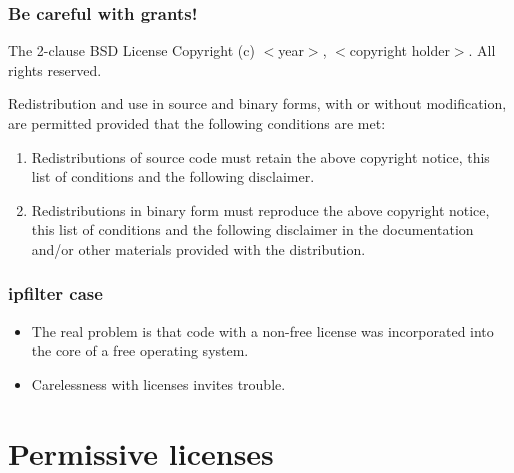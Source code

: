 \documentclass{beamer}
\begin{document}

\begin{frame}
\frametitle{Be careful with grants!}

\begin{block}{The 2-clause BSD License} 
Copyright (c) $<$year$>$, $<$copyright holder$>$. All rights reserved.

Redistribution and use in source and binary forms, \alert{with or without
modification}, are permitted provided that the following conditions
are met:

\small

\begin{enumerate}
\item Redistributions of source code must retain the above copyright notice, this list of  conditions and the following disclaimer.
\item Redistributions in binary form must reproduce the above copyright notice, this list of conditions and the following disclaimer in the documentation and/or other materials provided with the distribution.
\end{enumerate}
 
\end{block}

\end{frame}


\begin{frame}
\frametitle{ipfilter case}

\begin{itemize}
\item The real problem is that code with a non-free license was incorporated into the core of a free operating system. 
\item Carelessness with licenses invites trouble.
\end{itemize}

\end{frame}



 
\section{Permissive licenses}
\end{document}
